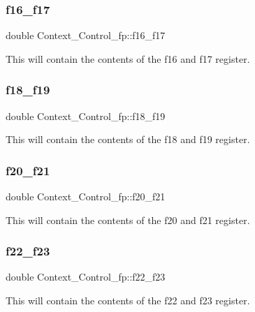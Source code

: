 \subsubsection{\texorpdfstring{f16\_f17}{f16\_f17}}
{\footnotesize\ttfamily double Context\+\_\+\+Control\+\_\+fp\+::f16\+\_\+f17}

This will contain the contents of the f16 and f17 register. \mbox{\label{structContext__Control__fp_aa8d48bdcc5760a463df8787c7bcfe62d}} 
\subsubsection{\texorpdfstring{f18\_f19}{f18\_f19}}
{\footnotesize\ttfamily double Context\+\_\+\+Control\+\_\+fp\+::f18\+\_\+f19}

This will contain the contents of the f18 and f19 register. \mbox{\label{structContext__Control__fp_a375f483cbe82d357e26d39ce414d7496}} 
\subsubsection{\texorpdfstring{f20\_f21}{f20\_f21}}
{\footnotesize\ttfamily double Context\+\_\+\+Control\+\_\+fp\+::f20\+\_\+f21}

This will contain the contents of the f20 and f21 register. \mbox{\label{structContext__Control__fp_ac293e7c6f53acc97f21cc291f836dde0}} 
\subsubsection{\texorpdfstring{f22\_f23}{f22\_f23}}
{\footnotesize\ttfamily double Context\+\_\+\+Control\+\_\+fp\+::f22\+\_\+f23}

This will contain the contents of the f22 and f23 register. \mbox{\label{structContext__Control__fp_a061956d709277f5aa1648ee10dbd7fe4}} 
